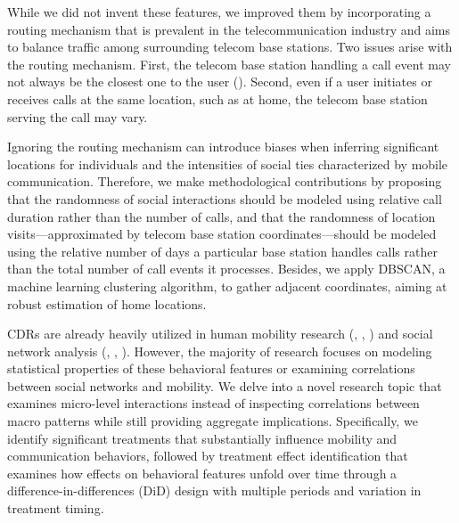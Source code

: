 While we did not invent these features, we improved them by incorporating a routing mechanism that is prevalent in the telecommunication industry and aims to balance traffic among surrounding telecom base stations.
Two issues arise with the routing mechanism.
First, the telecom base station handling a call event may not always be the closest one to the user (\cite{yuan2012correlating}).
Second, even if a user initiates or receives calls at the same location, such as at home, the telecom base station serving the call may vary.

Ignoring the routing mechanism can introduce biases when inferring significant locations for individuals and the intensities of social ties characterized by mobile communication.
Therefore, we make methodological contributions by proposing that the randomness of social interactions should be modeled using relative call duration rather than the number of calls, and that the randomness of location visits---approximated by telecom base station coordinates---should be modeled using the relative number of days a particular base station handles calls rather than the total number of call events it processes.
Besides, we apply DBSCAN, a machine learning clustering algorithm, to gather adjacent coordinates, aiming at robust estimation of home locations.

CDRs are already heavily utilized in human mobility research (\cite{gonzalez2008understanding}, \cite{song2010limits}, \cite{wesolowski2016connecting}) and social network analysis (\cite{onnela2007structure}, \cite{cho2011friendship}, \cite{referral_effect_2023aer}).
However, the majority of research focuses on modeling statistical properties of these behavioral features or examining correlations between social networks and mobility.
We delve into a novel research topic that examines micro-level interactions instead of inspecting correlations between macro patterns while still providing aggregate implications. Specifically, we identify significant treatments that substantially influence mobility and communication behaviors, followed by treatment effect identification that examines how effects on behavioral features unfold over time through a difference-in-differences (DiD) design with multiple periods and variation in treatment timing.

